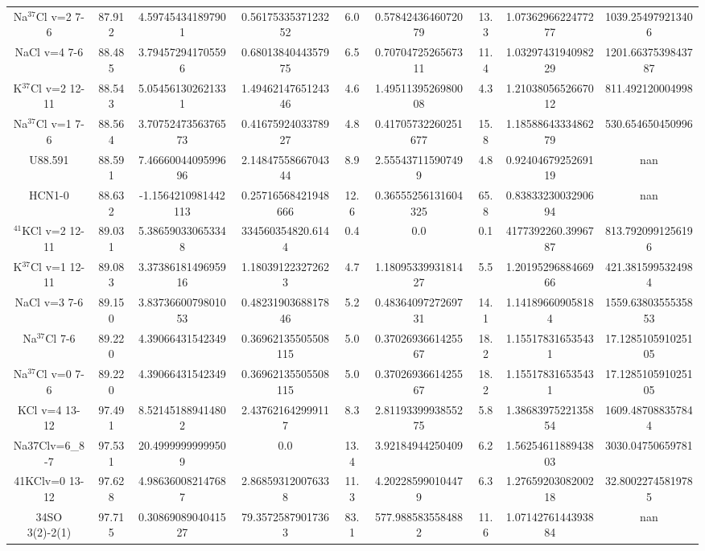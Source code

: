 \begin{table*}[htp]
\begin{tabular}{ccccccccc}
Na$^{37}$Cl v=2 7-6 & 87.912 & 4.597454341897901 & 0.5617533537123252 & 6.0 & 0.5784243646072079 & 13.3 & 1.0736296622477277 & 1039.254979213406 \\
NaCl v=4 7-6 & 88.485 & 3.794572941705596 & 0.6801384044357975 & 6.5 & 0.7070472526567311 & 11.4 & 1.0329743194098229 & 1201.6637539843787 \\
K$^{37}$Cl v=2 12-11 & 88.543 & 5.054561302621331 & 1.4946214765124346 & 4.6 & 1.4951139526980008 & 4.3 & 1.2103805652667012 & 811.492120004998 \\
Na$^{37}$Cl v=1 7-6 & 88.564 & 3.7075247356376573 & 0.4167592403378927 & 4.8 & 0.41705732260251677 & 15.8 & 1.1858864333486279 & 530.654650450996 \\
U88.591 & 88.591 & 7.4666004409599696 & 2.1484755866704344 & 8.9 & 2.555437115907499 & 4.8 & 0.9240467925269119 & nan \\
HCN1-0 & 88.632 & -1.1564210981442113 & 0.25716568421948666 & 12.6 & 0.36555256131604325 & 65.8 & 0.8383323003290694 & nan \\
$^{41}$KCl v=2 12-11 & 89.031 & 5.386590330653348 & 334560354820.6144 & 0.4 & 0.0 & 0.1 & 4177392260.3996787 & 813.7920991256196 \\
K$^{37}$Cl v=1 12-11 & 89.083 & 3.3738618149695916 & 1.180391223272623 & 4.7 & 1.1809533993181427 & 5.5 & 1.2019529688466966 & 421.3815995324984 \\
NaCl v=3 7-6 & 89.150 & 3.8373660079801053 & 0.4823190368817846 & 5.2 & 0.4836409727269731 & 14.1 & 1.141896609058184 & 1559.6380355535853 \\
Na$^{37}$Cl 7-6 & 89.220 & 4.39066431542349 & 0.36962135505508115 & 5.0 & 0.3702693661425567 & 18.2 & 1.155178316535431 & 17.128510591025105 \\
Na$^{37}$Cl v=0 7-6 & 89.220 & 4.39066431542349 & 0.36962135505508115 & 5.0 & 0.3702693661425567 & 18.2 & 1.155178316535431 & 17.128510591025105 \\
KCl v=4 13-12 & 97.491 & 8.521451889414802 & 2.437621642999117 & 8.3 & 2.8119339993855275 & 5.8 & 1.3868397522135854 & 1609.487088357844 \\
Na37Clv=6_8-7 & 97.531 & 20.49999999999509 & 0.0 & 13.4 & 3.92184944250409 & 6.2 & 1.5625461188943803 & 3030.04750659781 \\
41KClv=0 13-12 & 97.628 & 4.986360082147687 & 2.868593120076338 & 11.3 & 4.202285990104479 & 6.3 & 1.2765920308200218 & 32.80022745819785 \\
34SO 3(2)-2(1) & 97.715 & 0.3086908904041527 & 79.35725879017363 & 83.1 & 577.9885835584882 & 11.6 & 1.0714276144393884 & nan \\

\end{tabular}
\end{table*}
